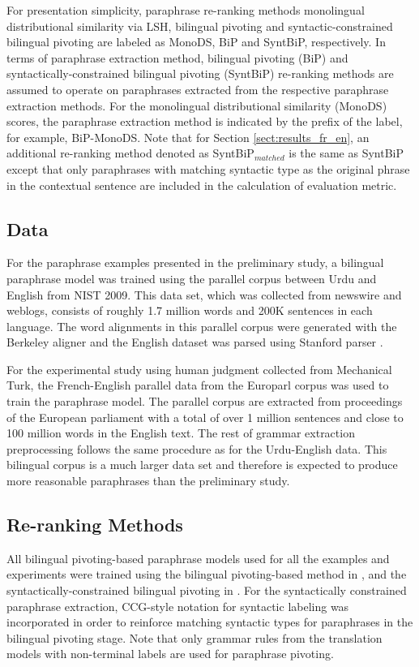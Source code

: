 \documentclass[11pt]{article}
\begin{document}
For presentation simplicity, paraphrase re-ranking methods monolingual distributional similarity via LSH, bilingual pivoting and syntactic-constrained bilingual pivoting are labeled as MonoDS, BiP and SyntBiP, respectively. In terms of paraphrase extraction method, bilingual pivoting (BiP) and syntactically-constrained bilingual pivoting (SyntBiP) re-ranking methods are assumed to operate on paraphrases extracted from the respective paraphrase extraction methods. For the monolingual distributional similarity (MonoDS) scores, the paraphrase extraction method is indicated by the prefix of the label, for example, BiP-MonoDS. Note that for Section \ref{sect:results_fr_en}, an additional re-ranking method denoted as SyntBiP$_{matched}$ is the same as SyntBiP except that only paraphrases with matching syntactic type as the original phrase in the contextual sentence are included in the calculation of evaluation metric.

\subsection{Data}

For the paraphrase examples presented in the preliminary study, a bilingual paraphrase model was trained using the parallel corpus between Urdu and English from NIST 2009. This data set, which was collected from newswire and weblogs, consists of roughly 1.7 million words and 200K sentences in each language. The word alignments in this parallel corpus were generated with the Berkeley aligner and the English dataset was parsed using Stanford parser \cite{KleinManning03}. %

For the experimental study using human judgment collected from Mechanical Turk, the French-English parallel data from the Europarl corpus\cite{Koehn05} was used to train the paraphrase model. The parallel corpus are extracted from proceedings of the European parliament with a total of over 1 million sentences and close to 100 million words in the English text. The rest of grammar extraction preprocessing follows the same procedure as for the Urdu-English data. This bilingual corpus is a much larger data set and therefore is expected to produce more reasonable paraphrases than the preliminary study.

\subsection{Re-ranking Methods}
All bilingual pivoting-based paraphrase models used for all the examples and experiments were trained using the bilingual pivoting-based method in , and the syntactically-constrained bilingual pivoting in . For the syntactically constrained paraphrase extraction, CCG-style notation for syntactic labeling \cite{Steedman99} was incorporated in order to reinforce matching syntactic types for paraphrases in the bilingual pivoting stage. Note that only grammar rules from the translation models with non-terminal labels are used for paraphrase pivoting.
\end{document}
